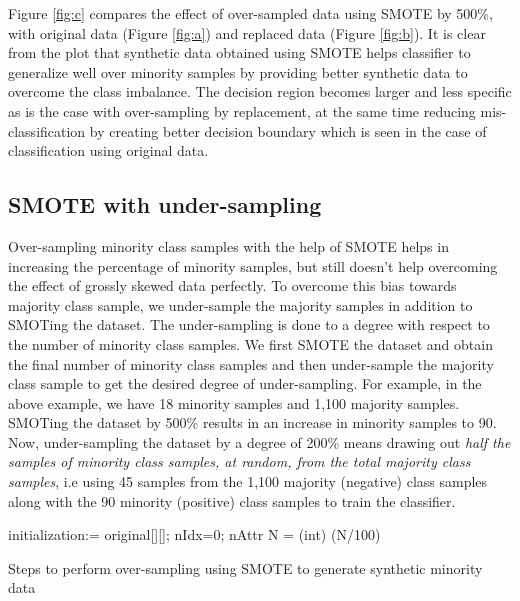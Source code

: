 \documentclass[10pt,journal,compsoc]{IEEEtran}
\begin{document}
Figure \ref{fig:c} compares the effect of over-sampled data using SMOTE by 500\%, with original data (Figure \ref{fig:a}) and replaced data (Figure \ref{fig:b}).
It is clear from the plot that synthetic data obtained using SMOTE helps classifier to generalize well over minority samples by providing better synthetic data to overcome the class imbalance.
The decision region becomes larger and less specific as is the case with over-sampling by replacement, at the same time reducing mis-classification by creating better decision boundary which is seen in the case of classification using original data.


\subsection{SMOTE with under-sampling}
\label{subsec:smoteu}
Over-sampling minority class samples with the help of SMOTE helps in increasing the percentage of minority samples, but still doesn't help overcoming the effect of grossly skewed data perfectly.
To overcome this bias towards majority class sample, we under-sample the majority samples in addition to SMOTing the dataset.
The under-sampling is done to a degree with respect to the number of minority class samples.
We first SMOTE the dataset and obtain the final number of minority class samples and then under-sample the majority class sample to get the desired degree of under-sampling.
For example, in the above example, we have 18 minority samples and 1,100 majority samples. 
SMOTing the dataset by 500\% results in an increase in minority samples to 90.
Now, under-sampling the dataset by a degree of 200\% means drawing out \textit{half the samples of minority class samples, at random, from the total majority class samples}, i.e using 45 samples from the 1,100 majority (negative) class samples along with the 90 minority (positive) class samples to train the classifier.

\begin{algorithm}[!h]
 initialization:= original[][]; nIdx=0;  nAttr\;
   N = (int) (N/100)\;
 \caption{Steps to perform over-sampling using SMOTE to generate synthetic minority data}
 \label{algo:smote}
\end{algorithm}
\end{document}
